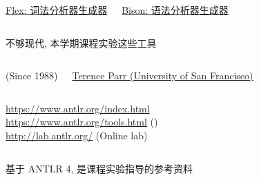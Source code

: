 \begin{frame}{}
  \begin{columns}
    \begin{center}
      \href{https://en.wikipedia.org/wiki/Flex_(lexical_analyser_generator)}{\footnotesize Flex: 词法分析器生成器}
    \end{center}
    \begin{center}
      \href{https://en.wikipedia.org/wiki/GNU_Bison}{\footnotesize Bison: 语法分析器生成器}
    \end{center}
  \end{columns}

  \vspace{0.50cm}
  \begin{center}
    不够现代, 本学期课程实验这些工具
  \end{center}
\end{frame}

\begin{frame}{}
  \begin{columns}
    \begin{center}
      (Since 1988)
    \end{center}
    \begin{center}
      \href{https://parrt.cs.usfca.edu/}{\small Terence Parr (University of San Francisco)}
    \end{center}
  \end{columns}

  \vspace{0.80cm}
  \begin{center}
    \url{https://www.antlr.org/index.html} \\[5pt]
    \url{https://www.antlr.org/tools.html} () \\[5pt]
    \url{http://lab.antlr.org/} (Online lab)
  \end{center}
\end{frame}

\begin{frame}{}
  \begin{columns}
  \end{columns}

  \vspace{0.50cm}
  \begin{center}
    基于 ANTLR 4, 是课程实验指导的参考资料
  \end{center}
\end{frame}

